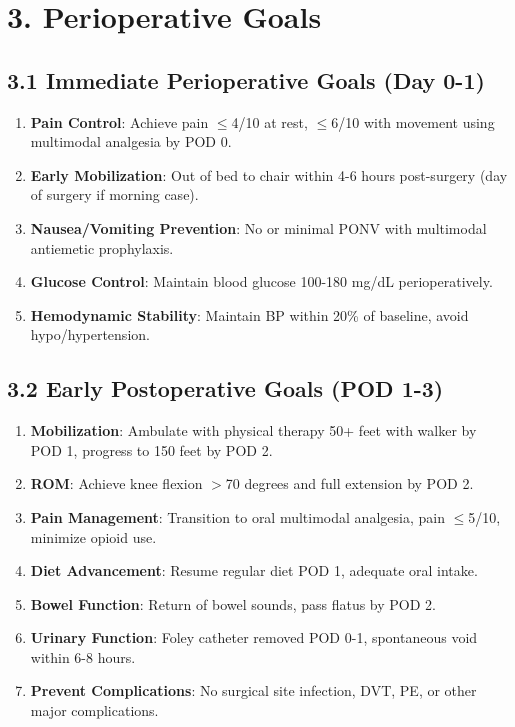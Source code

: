 \documentclass[11pt,letterpaper]{article}
\begin{document}
\section*{3. Perioperative Goals}

\subsection*{3.1 Immediate Perioperative Goals (Day 0-1)}

\begin{enumerate}[leftmargin=*]
    \item \textbf{Pain Control}: Achieve pain $\leq$4/10 at rest, $\leq$6/10 with movement using multimodal analgesia by POD 0.

    \item \textbf{Early Mobilization}: Out of bed to chair within 4-6 hours post-surgery (day of surgery if morning case).

    \item \textbf{Nausea/Vomiting Prevention}: No or minimal PONV with multimodal antiemetic prophylaxis.

    \item \textbf{Glucose Control}: Maintain blood glucose 100-180 mg/dL perioperatively.

    \item \textbf{Hemodynamic Stability}: Maintain BP within 20\% of baseline, avoid hypo/hypertension.
\end{enumerate}

\subsection*{3.2 Early Postoperative Goals (POD 1-3)}

\begin{enumerate}[leftmargin=*]
    \item \textbf{Mobilization}: Ambulate with physical therapy 50+ feet with walker by POD 1, progress to 150 feet by POD 2.

    \item \textbf{ROM}: Achieve knee flexion $>$70 degrees and full extension by POD 2.

    \item \textbf{Pain Management}: Transition to oral multimodal analgesia, pain $\leq$5/10, minimize opioid use.

    \item \textbf{Diet Advancement}: Resume regular diet POD 1, adequate oral intake.

    \item \textbf{Bowel Function}: Return of bowel sounds, pass flatus by POD 2.

    \item \textbf{Urinary Function}: Foley catheter removed POD 0-1, spontaneous void within 6-8 hours.

    \item \textbf{Prevent Complications}: No surgical site infection, DVT, PE, or other major complications.
\end{enumerate}
\end{document}
